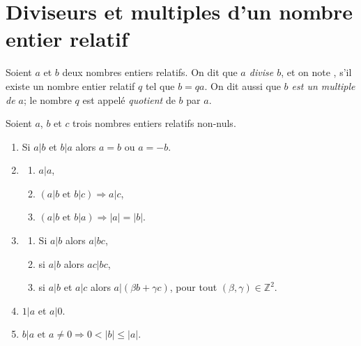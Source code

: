 \section{Diviseurs et multiples d'un nombre entier relatif}
\begin{defi}[Divisibilit\'e] 
Soient $a$ et $b$ deux nombres entiers relatifs.
On dit que \emph{$a$ divise $b$}, et on note , s'il existe un nombre entier relatif $q$ tel que $b = q a$.
On dit aussi que \emph{$b$ est un multiple de $a$}; 
le nombre $q$ est appel\'e \emph{quotient} de $b$ par $a$.
\end{defi}
%
\begin{prop}
\label{prop:divisibilite}
Soient $a$, $b$ et $c$ trois nombres entiers relatifs non-nuls.
      \begin{enumerate}
      \item Si $a|b$ et $b|a$ alors $a = b$ ou $a = -b$.
      \item \begin{enumerate}
            \item $a|a$,
            \item $(a|b \text{ et } b|c) \Rightarrow a|c$,
            \item $(a|b \text{ et } b|a) \Rightarrow |a| = |b|$.
            \end{enumerate}
      \item \begin{enumerate}
            \item Si $a|b$ alors $a|bc$,
            \item si $a|b$ alors $ac|bc$,
            \item si $a|b$ et $a|c$ alors $a|(\beta b + \gamma c)$, pour tout $(\beta, \gamma) \in \mathbb{Z}^2$.
            \end{enumerate}
      \item $1|a$ et $a|0$.
      \item $b|a \text{ et } a\neq 0 \Rightarrow 0 < |b| \leq |a|$.
      \end{enumerate}
%
\end{prop}

